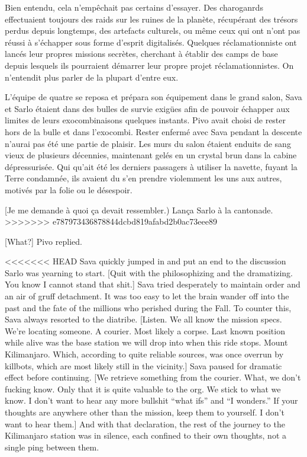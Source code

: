 Bien entendu, cela n'empêchait pas certains d'essayer. Des charoganrds effectuaient toujours des raids sur les ruines de la planète, récupérant des trésors perdus depuis longtemps, des artefacts culturels, ou même ceux qui ont n'ont pas réussi à s'échapper sous forme d'esprit digitalisés. Quelques réclamationniste ont lancés leur propres missions secrètes, cherchant à établir des camps de base depuis lesquels ils pourraient démarrer leur propre projet réclamationnistes. On n'entendit plus parler de la plupart d'entre eux. 

L'équipe de quatre se reposa et prépara son équipement dans le grand salon, Sava et Sarlo étaient dans des bulles de survie exigües afin de pouvoir échapper aux limites de leurs exocombinaisons quelques instants. Pivo avait choisi de rester hors de la bulle et dans l'exocombi. Rester enfermé avec Sava pendant la descente n'aurai pas été une partie de plaisir. Les murs du salon étaient enduits de sang vieux de plusieurs décennies, maintenant gelés en un crystal brun dans la cabine dépressurisée. Qui qu'ait été les derniers passagers à utiliser la navette, fuyant la Terre condamnée, ils avaient du s'en prendre violemment les uns aux autres, motivés par la folie ou le désespoir. 

[Je me demande à quoi ça devait ressembler.) Lança Sarlo à la cantonade. 
>>>>>>> e787973436878844dcbd819afabd2b0ac73eee89

[What?] Pivo replied. 

<<<<<<< HEAD
Sava quickly jumped in and put an end to the discussion Sarlo was yearning to start. [Quit with the philosophizing and the dramatizing. You know I cannot stand that shit.] Sava tried desperately to maintain order and an air of gruff detachment. It was too easy to let the brain wander off into the past and the fate of the millions who perished during the Fall. To counter this, Sava always resorted to the diatribe. [Listen. We all know the mission specs. We're locating someone. A courier. Most likely a corpse. Last known position while alive was the base station we will drop into when this ride stops. Mount Kilimanjaro. Which, according to quite reliable sources, was once overrun by killbots, which are most likely still in the vicinity.] Sava paused for dramatic effect before continuing. [We retrieve something from the courier. What, we don't fucking know. Only that it is quite valuable to the org. We stick to what we know. I don't want to hear any more bullshit ``what ifs'' and ``I wonders.'' If your thoughts are anywhere other than the mission, keep them to yourself. I don't want to hear them.] And with that declaration, the rest of the journey to the Kilimanjaro station was in silence, each confined to their own thoughts, not a single ping between them. 

